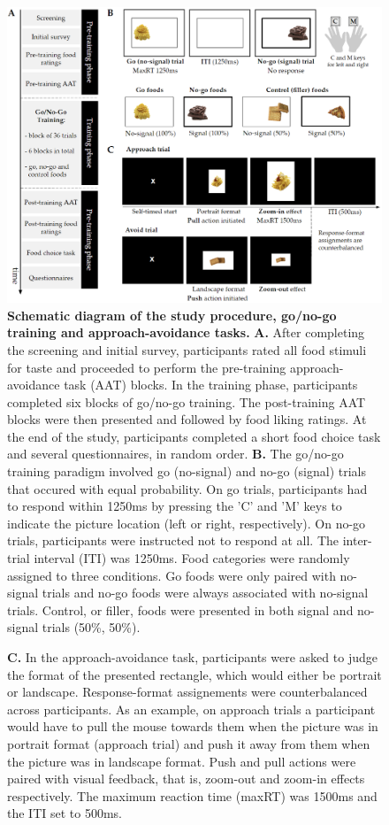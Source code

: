 \documentclass[man,floatsintext]{apa6}
\begin{document}
\begin{figure} [!htb]
\centering
\includegraphics[width=\linewidth]{figures/Figure1.png}
\caption{\textbf{Schematic diagram of the study procedure, go/no-go training and approach-avoidance tasks.} \textbf{A.} After completing the screening and initial survey, participants rated all food stimuli for taste and proceeded to perform the pre-training approach-avoidance task (AAT) blocks. In the training phase, participants completed six blocks of go/no-go training. The post-training AAT blocks were then presented and followed by food liking ratings. At the end of the study, participants completed a short food choice task and several questionnaires, in random order. \textbf{B.} The go/no-go training paradigm involved go (no-signal) and no-go (signal) trials that occured with equal probability. On go trials, participants had to respond within 1250ms by pressing the 'C' and 'M' keys to indicate the picture location (left or right, respectively). On no-go trials, participants were instructed not to respond at all. The inter-trial interval (ITI) was 1250ms. Food categories were randomly assigned to three conditions. Go foods were only paired with no-signal trials and no-go foods were always associated with no-signal trials. Control, or filler, foods were presented in both signal and no-signal trials (50\%, 50\%).}
\label{fig:ch5_hypotheses}
\end{figure}
\clearpage
\begin{figure}
    \ContinuedFloat
    \captionsetup{labelformat=empty}
    \caption{\textbf{C.} In the approach-avoidance task, participants were asked to judge the format of the presented rectangle, which would either be portrait or landscape. Response-format assignements were counterbalanced across participants. As an example, on approach trials a participant would have to pull the mouse towards them when the picture was in portrait format (approach trial) and push it away from them when the picture was in landscape format. Push and pull actions were paired with visual feedback, that is, zoom-out and zoom-in effects respectively. The maximum reaction time (maxRT) was 1500ms and the ITI set to 500ms.}
\end{figure}
\end{document}
